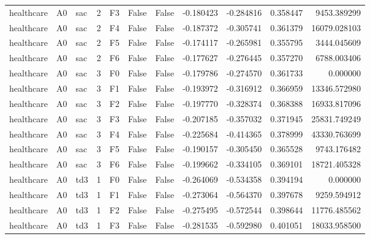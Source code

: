 \begin{tabular}{lllrlllrrrr}
healthcare &      A0 &       sac &     2 &  F3 &           False &            False & -0.180423 & -0.284816 & 0.358447 &      9453.389299 \\
healthcare &      A0 &       sac &     2 &  F4 &           False &            False & -0.187372 & -0.305741 & 0.361379 &     16079.028103 \\
healthcare &      A0 &       sac &     2 &  F5 &           False &            False & -0.174117 & -0.265981 & 0.355795 &      3444.045609 \\
healthcare &      A0 &       sac &     2 &  F6 &           False &            False & -0.177627 & -0.276445 & 0.357270 &      6788.003406 \\
healthcare &      A0 &       sac &     3 &  F0 &           False &            False & -0.179786 & -0.274570 & 0.361733 &         0.000000 \\
healthcare &      A0 &       sac &     3 &  F1 &           False &            False & -0.193972 & -0.316912 & 0.366959 &     13346.572980 \\
healthcare &      A0 &       sac &     3 &  F2 &           False &            False & -0.197770 & -0.328374 & 0.368388 &     16933.817096 \\
healthcare &      A0 &       sac &     3 &  F3 &           False &            False & -0.207185 & -0.357032 & 0.371945 &     25831.749249 \\
healthcare &      A0 &       sac &     3 &  F4 &           False &            False & -0.225684 & -0.414365 & 0.378999 &     43330.763699 \\
healthcare &      A0 &       sac &     3 &  F5 &           False &            False & -0.190157 & -0.305450 & 0.365528 &      9743.176482 \\
healthcare &      A0 &       sac &     3 &  F6 &           False &            False & -0.199662 & -0.334105 & 0.369101 &     18721.405328 \\
healthcare &      A0 &       td3 &     1 &  F0 &           False &            False & -0.264069 & -0.534358 & 0.394194 &         0.000000 \\
healthcare &      A0 &       td3 &     1 &  F1 &           False &            False & -0.273064 & -0.564370 & 0.397678 &      9259.594912 \\
healthcare &      A0 &       td3 &     1 &  F2 &           False &            False & -0.275495 & -0.572544 & 0.398644 &     11776.485562 \\
healthcare &      A0 &       td3 &     1 &  F3 &           False &            False & -0.281535 & -0.592980 & 0.401051 &     18033.958500 \\

\end{tabular}
